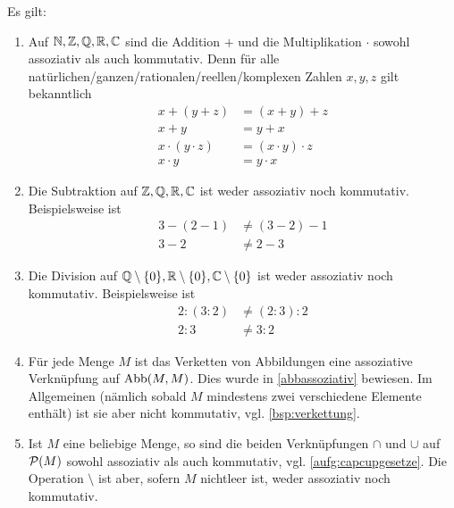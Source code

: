 \begin{bsp}
    Es gilt:
    \begin{enumerate}
        \item Auf $\mathbb N,\mathbb Z,\mathbb Q,\mathbb R,\mathbb C$ sind die Addition $+$ und die Multiplikation $\cdot$ sowohl assoziativ als auch kommutativ. Denn für alle natürlichen/ganzen/rationalen/reellen/komplexen Zahlen $x,y,z$ gilt bekanntlich
        \begin{align*}
            x+(y+z)& = (x+y)+z  \\
            x+y & = y+x \\
            x\cdot (y\cdot z) & = (x\cdot y)\cdot z  \\
            x\cdot y & = y\cdot x
        \end{align*}
        \item Die Subtraktion auf $\mathbb Z,\mathbb Q,\mathbb R,\mathbb C$ ist weder assoziativ noch kommutativ. Beispielsweise ist
        \begin{align*}
            3-(2-1) &\neq  (3-2)-1  \\
            3-2 &\neq 2-3
        \end{align*}
        \item Die Division auf $\mathbb Q\setminus \{0\},\mathbb R\setminus \{0\},\mathbb C\setminus \{0\}$ ist weder assoziativ noch kommutativ. Beispielsweise ist
        \begin{align*}
            2:(3:2) &\neq (2:3):2 \\
            2 : 3 & \neq 3:2
        \end{align*}
        \item Für jede Menge $M$ ist das Verketten von Abbildungen eine assoziative Verknüpfung auf $\operatorname{Abb}(M,M)$. Dies wurde in \cref{abbassoziativ} bewiesen. Im Allgemeinen (nämlich sobald $M$ mindestens zwei verschiedene Elemente enthält) ist sie aber nicht kommutativ, vgl. \cref{bsp:verkettung}.
        \item Ist $M$ eine beliebige Menge, so sind die beiden Verknüpfungen $\cap$ und $\cup$ auf $\mathcal P(M)$ sowohl assoziativ als auch kommutativ, vgl. \cref{aufg:capcupgesetze}. Die Operation $\setminus$ ist aber, sofern $M$ nichtleer ist, weder assoziativ noch kommutativ.
    \end{enumerate}
\end{bsp}


